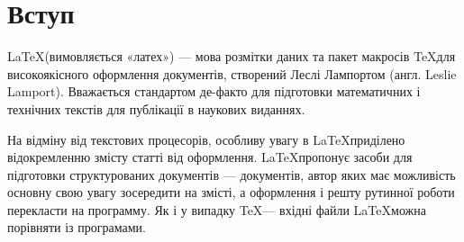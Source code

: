 \section*{Вступ}

\LaTeX (вимовляється «латех») — мова розмітки даних та пакет макросів \TeX для високоякісного оформлення документів, створений Леслі Лампортом (англ. Leslie Lamport). Вважається стандартом де-факто для підготовки математичних і технічних текстів для публікації в наукових виданнях.

На відміну від текстових процесорів, особливу увагу в \LaTeX приділено відокремленню змісту статті від оформлення. \LaTeX пропонує засоби для підготовки структурованих документів — документів, автор яких має можливість основну свою увагу зосередити на змісті, а оформлення і решту рутинної роботи перекласти на программу. Як і у випадку \TeX — вхідні файли \LaTeX можна порівняти із програмами.